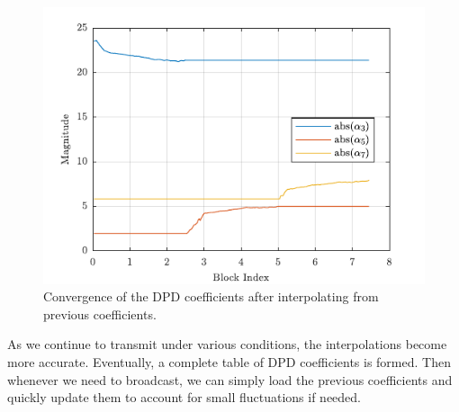 \begin{figure}[t!] 
\centering
\includegraphics[]{Figures/Interpolate}
\caption{Convergence of the DPD coefficients after interpolating from previous coefficients.}
\label{fig:Interpolate}
\end{figure}

 As we continue to transmit under various conditions, the interpolations become more accurate. Eventually, a complete table of DPD coefficients is formed. Then whenever we need to broadcast, we can simply load the previous coefficients and quickly update them to account for small fluctuations if needed. 






